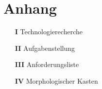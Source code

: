 


\section{Anhang}
 
\begin{itemize}
  \item[\textbf{I}] Technologierecherche
  \item[\textbf{II}] Aufgabenstellung
  \item[\textbf{III}] Anforderungsliste
  \item[\textbf{IV}] Morphologischer Kasten
\end{itemize}
 








